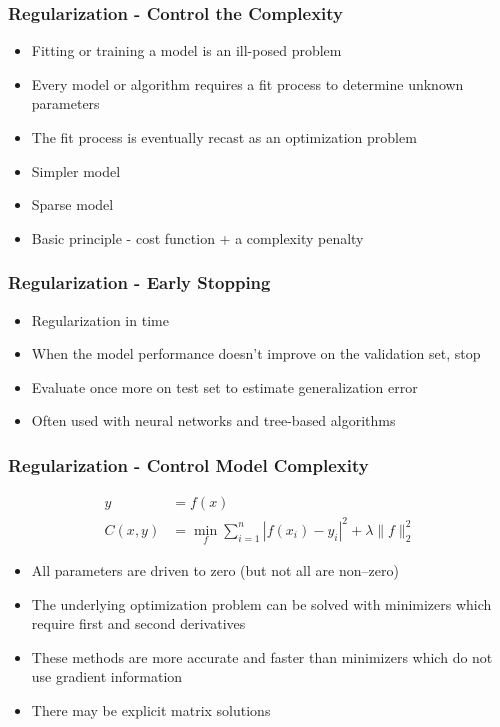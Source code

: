 \documentclass{beamer}
\begin{document}
\begin{frame}
\frametitle{Regularization - Control the Complexity}
\begin{itemize}
\item Fitting or training a model is an ill-posed problem
\item Every model or algorithm requires a fit process to determine unknown parameters
\item The fit process is eventually recast as an optimization problem
\item Simpler model
\item Sparse model
\item Basic principle - cost function + a complexity penalty
\end{itemize}
\end{frame}

\begin{frame}
\frametitle{Regularization - Early Stopping}
\begin{itemize}
\item Regularization in time
\item When the model performance doesn't improve on the validation set, stop
\item Evaluate once more on test set to estimate generalization error
\item Often used with neural networks and tree-based algorithms
\end{itemize}
\end{frame}

\begin{frame}
\frametitle{Regularization - Control Model Complexity}
\begin{align}
y &= f(x) \\
C(x, y) &= \min_f \sum_{i=1}^{n} \left| f(x_i) - y_i \right|^2 + \lambda \| f \|_2^2
\end{align}
\begin{itemize}
\item All parameters are driven to zero (but not all are non--zero)
\item The underlying optimization problem can be solved with minimizers which require first and second derivatives
\item These methods are more accurate and faster than minimizers which do not use gradient information
\item There may be explicit matrix solutions
\end{itemize}
\end{frame}
\end{document}
